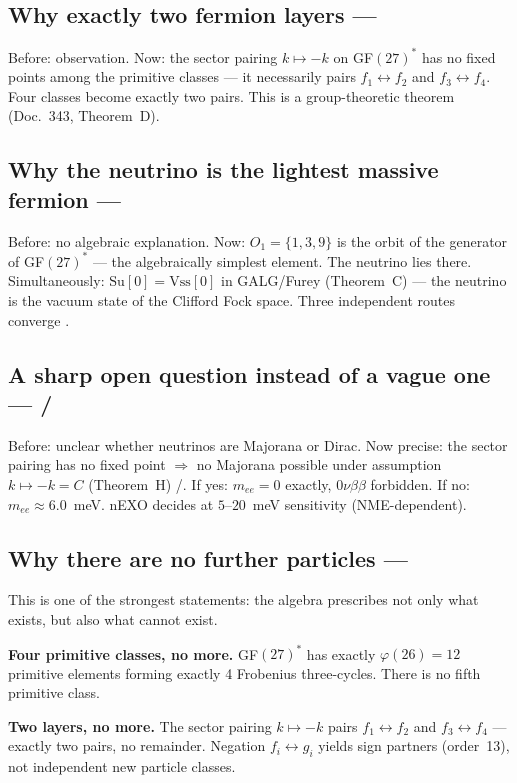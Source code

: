 \subsection*{Why exactly two fermion layers --- \BM}
Before: observation.
Now: the sector pairing $k\mapsto-k$ on GF$(27)^*$ has no fixed points
among the primitive classes --- it necessarily pairs $f_1\leftrightarrow f_2$
and $f_3\leftrightarrow f_4$. Four classes become exactly two pairs.
This is a group-theoretic theorem (Doc.~343, Theorem~D).

\subsection*{Why the neutrino is the lightest massive fermion --- \BM}
Before: no algebraic explanation.
Now: $O_1=\{1,3,9\}$ is the orbit of the generator of GF$(27)^*$ ---
the algebraically simplest element. The neutrino lies there.
Simultaneously: $\mathrm{Su}[0]=\mathrm{Vss}[0]$ in GALG/Furey (Theorem~C) ---
the neutrino is the vacuum state of the Clifford Fock space.
Three independent routes converge \BM.

\subsection*{A sharp open question instead of a vague one --- \BM/\SM}
Before: unclear whether neutrinos are Majorana or Dirac.
Now precise: the sector pairing has no fixed point
$\Rightarrow$ no Majorana possible under assumption $k\mapsto-k=C$
(Theorem~H) \BM/\SM.
If yes: $m_{ee}=0$ exactly, $0\nu\beta\beta$ forbidden.
If no: $m_{ee}\approx6.0$~meV.
nEXO decides at $5$--$20$~meV sensitivity (NME-dependent).


\subsection*{Why there are no further particles --- \BM}

This is one of the strongest statements: the algebra prescribes not only
what exists, but also what cannot exist.

\textbf{Four primitive classes, no more.}
GF$(27)^*$ has exactly $\varphi(26)=12$ primitive elements forming exactly
4 Frobenius three-cycles. There is no fifth primitive class.

\textbf{Two layers, no more.}
The sector pairing $k\mapsto-k$ pairs $f_1\leftrightarrow f_2$ and
$f_3\leftrightarrow f_4$ --- exactly two pairs, no remainder.
Negation $f_i\leftrightarrow g_i$ yields sign partners (order~13),
not independent new particle classes.

